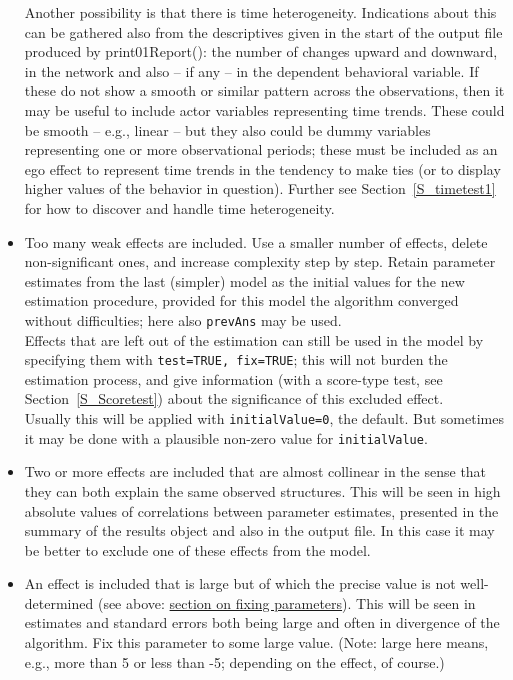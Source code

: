 \documentclass[a4paper,fleqn,11pt]{article}
\newcommand{\+}{\, + \,}
\newcommand{\sfn}[1]{\textsf{#1}}
\begin{document}
\begin{itemize}
      Another possibility is that there is time heterogeneity.
      Indications about this can be gathered also from the descriptives
      given in the start of the output file produced by \sfn{print01Report()}:
      the number of changes
      upward and downward, in the network and also -- if any -- in the
      dependent behavioral variable. If these do not show a smooth
      or similar pattern across the observations, then it may be useful
      to include actor variables representing time trends. These
      could be smooth -- e.g., linear -- but they also could be dummy variables
      representing one or more observational periods; these must be included
      as an ego effect to represent time trends in the tendency to make ties
      (or to display higher values of the behavior in question).
      Further see Section~\ref{S_timetest1} for how to discover and handle
      time heterogeneity.
\item Too many weak effects are included. Use a smaller number of effects,
      delete non-significant ones, and increase complexity step by step.
      Retain parameter estimates from the last
      (simpler) model as the initial values for the new estimation procedure,
      provided for this model the algorithm converged
      without difficulties; here also \texttt{prevAns} may be used.\\
      Effects that are left out of the estimation can still be
      used in the model by specifying them with \texttt{test=TRUE, fix=TRUE};
      this will not burden the estimation process, and give information
      (with a score-type test, see Section~\ref{S_Scoretest})
      about the significance of this excluded effect.\\
      Usually this will be applied with \texttt{initialValue=0}, the default.
      But sometimes it may be done with a plausible non-zero value for
      \texttt{initialValue}.
\item Two or more effects are included that are almost collinear
      in the sense that they can both explain the same observed structures.
      This will be seen in high absolute values of
      correlations between parameter estimates, presented in the
      \sfn{summary} of the results object and also in the output file.
      In this case it may be better to exclude one of these effects from the model.
\item An effect is included that is large but of which the precise
      value is not well-determined (see above:
      \hyperlink{T_fix}{section on fixing parameters}).
      This will be seen in estimates and standard errors both being large
      and often in divergence of the algorithm.
      Fix this parameter to some large value.
      (Note: large here means, e.g., more than 5 or less than -5; depending
      on the effect, of course.)
\end{itemize}
\end{document}
